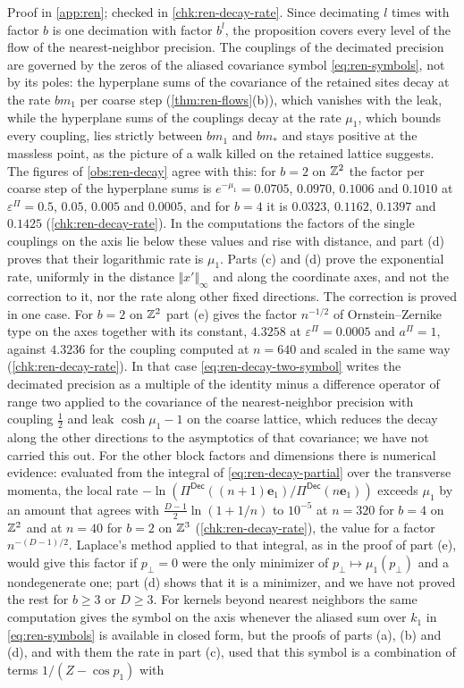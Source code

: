 Proof in \cref{app:ren}; checked in \cref{chk:ren-decay-rate}. Since decimating $l$ times with factor $b$ is one decimation with factor $b^l$, the proposition covers every level of the flow of the nearest-neighbor precision. The couplings of the decimated precision are governed by the zeros of the aliased covariance symbol \eqref{eq:ren-symbols}, not by its poles: the hyperplane sums of the covariance of the retained sites decay at the rate $bm_1$ per coarse step (\cref{thm:ren-flows}(b)), which vanishes with the leak, while the hyperplane sums of the couplings decay at the rate $\mu_1$, which bounds every coupling, lies strictly between $bm_1$ and $bm_\ast$ and stays positive at the massless point, as the picture of a walk killed on the retained lattice suggests. The figures of \cref{obs:ren-decay} agree with this: for $b=2$ on $\mathbb{Z}^2$ the factor per coarse step of the hyperplane sums is $e^{-\mu_1}=0.0705$, $0.0970$, $0.1006$ and $0.1010$ at $\varepsilon^\Pi=0.5$, $0.05$, $0.005$ and $0.0005$, and for $b=4$ it is $0.0323$, $0.1162$, $0.1397$ and $0.1425$ (\cref{chk:ren-decay-rate}). In the computations the factors of the single couplings on the axis lie below these values and rise with distance, and part (d) proves that their logarithmic rate is $\mu_1$. Parts (c) and (d) prove the exponential rate, uniformly in the distance $\Vert x'\Vert_\infty$ and along the coordinate axes, and not the correction to it, nor the rate along other fixed directions. The correction is proved in one case. For $b=2$ on $\mathbb{Z}^2$ part (e) gives the factor $n^{-1/2}$ of Ornstein--Zernike type on the axes together with its constant, $4.3258$ at $\varepsilon^\Pi=0.0005$ and $a^\Pi=1$, against $4.3236$ for the coupling computed at $n=640$ and scaled in the same way (\cref{chk:ren-decay-rate}). In that case \eqref{eq:ren-decay-two-symbol} writes the decimated precision as a multiple of the identity minus a difference operator of range two applied to the covariance of the nearest-neighbor precision with coupling $\frac12$ and leak $\cosh\mu_1-1$ on the coarse lattice, which reduces the decay along the other directions to the asymptotics of that covariance; we have not carried this out. For the other block factors and dimensions there is numerical evidence: evaluated from the integral of \eqref{eq:ren-decay-partial} over the transverse momenta, the local rate $-\ln(\Pi^{\mathsf{Dec}}((n+1)\mathbf e_1)/\Pi^{\mathsf{Dec}}(n\mathbf e_1))$ exceeds $\mu_1$ by an amount that agrees with $\frac{D-1}2\ln(1+1/n)$ to $10^{-5}$ at $n=320$ for $b=4$ on $\mathbb{Z}^2$ and at $n=40$ for $b=2$ on $\mathbb{Z}^3$ (\cref{chk:ren-decay-rate}), the value for a factor $n^{-(D-1)/2}$. Laplace's method applied to that integral, as in the proof of part (e), would give this factor if $p_\perp=0$ were the only minimizer of $p_\perp\mapsto\mu_1(p_\perp)$ and a nondegenerate one; part (d) shows that it is a minimizer, and we have not proved the rest for $b\ge3$ or $D\ge3$. For kernels beyond nearest neighbors the same computation gives the symbol on the axis whenever the aliased sum over $k_1$ in \eqref{eq:ren-symbols} is available in closed form, but the proofs of parts (a), (b) and (d), and with them the rate in part (c), used that this symbol is a combination of terms $1/(Z-\cos p_1)$ with 